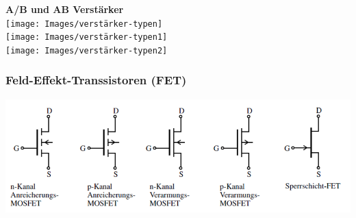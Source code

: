 \textbf{A/B und AB Verstärker}\\
\texttt{[image: Images/verstärker-typen]}\\
\texttt{[image: Images/verstärker-typen1]}\\
\texttt{[image: Images/verstärker-typen2]}

\subsubsection{Feld-Effekt-Transsistoren (FET)}
\includegraphics[width=\columnwidth]{Images/fet-typen}
